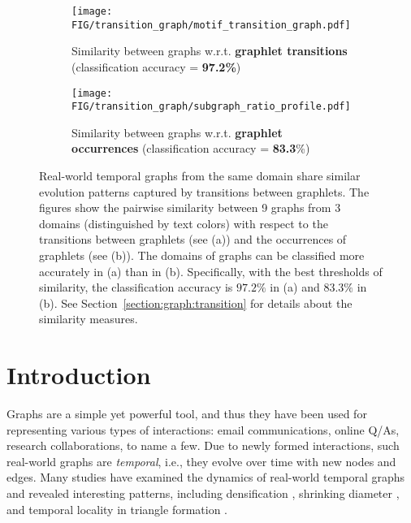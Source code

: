 \begin{figure}[t]
     \captionsetup[subfigure]{justification=centering}
    \begin{subfigure}{0.23\textwidth}
         \texttt{[image: FIG/transition\_graph/motif\_transition\_graph.pdf]}
         \caption{Similarity between graphs w.r.t. \textbf{graphlet transitions} 
         \newline(classification accuracy = \textbf{97.2\%})}
     \end{subfigure}
     \begin{subfigure}{0.23\textwidth}
        \texttt{[image: FIG/transition\_graph/subgraph\_ratio\_profile.pdf]}
        \caption{Similarity between graphs w.r.t. \textbf{graphlet occurrences}
        (classification accuracy = \textbf{83.3}\%)}
     \end{subfigure}
     
      \caption{\label{fig:domain_correlation} 
      Real-world temporal graphs from the same domain share similar evolution patterns captured by transitions between graphlets. The figures show the pairwise similarity between 9 graphs from 3 domains (distinguished by text colors) with respect to the transitions between graphlets (see (a)) and the occurrences of graphlets (see (b)). The domains of graphs can be classified more accurately in (a) than in (b). Specifically, with the best thresholds of similarity, the classification accuracy is $97.2\%$ in (a) and $83.3\%$ in (b). See Section~\ref{section:graph:transition} for details about the similarity measures.
      }
\end{figure}

\section{Introduction}
\label{sec:intro}
Graphs are a simple yet powerful tool, and thus they have been used for representing various types of 
interactions: email communications, online Q/As, research collaborations, to name a few.
Due to newly formed interactions, such real-world graphs are \textit{temporal}, i.e., they evolve over time with new nodes and edges.
Many studies have examined the dynamics of real-world temporal graphs and revealed interesting patterns, including densification \cite{leskovec2005graphs}, shrinking diameter \cite{leskovec2005graphs}, and temporal locality in triangle formation \cite{lee2020temporal}.


